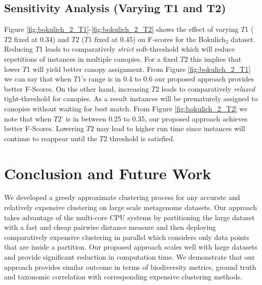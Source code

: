 \documentclass[10pt, conference, compsocconf]{IEEEtran}
\begin{document}
 

\subsection{\textbf{Sensitivity Analysis (Varying T1 and T2)}}
Figure \ref{fig:bokulich_2_T1}-\ref{fig:bokulich_2_T2} shows the 
effect of varying $T1$ ($T2$ fixed at 0.34) and $T2$ ($T1$ fixed at 0.45) on F-scores for the Bokulich$_2$ dataset. Reducing $T1$ leads to
comparatively \textit{strict} soft-threshold which will reduce 
repetitions of instances in multiple canopies. For a fixed $T2$ this implies that 
lower $T1$ will yield better canopy assignment. From Figure \ref{fig:bokulich_2_T1} we can say that 
when $T1$'s range is in 0.4 to 0.6 our proposed approach provides better 
F-Scores. On the other hand, increasing $T2$ leads to comparatively \textit{relaxed} tight-threshold for canopies. As a result instances will be prematurely assigned to canopies without waiting for best match. From Figure \ref{fig:bokulich_2_T2} we note that 
when $T2$'  is in between 0.25 to 0.35, 
our proposed approach achieves better F-Scores. Lowering 
$T2$ may lead to higher run time since instances will continue to reappear 
until the $T2$ threshold is satisfied.                   


\section{Conclusion and Future Work}
\label{sec:Conclusion}

We developed a greedy approximate clustering process for any accurate and relatively expensive clustering on large scale metagenome datasets. Our approach takes advantage of the multi-core CPU systems by partitioning the large dataset with a fast and cheap pairwise distance measure and then deploying comparatively expensive clustering in parallel which considers only data points that are inside a partition. Our proposed approach scales well with large datasets and provide significant reduction in computation time. We demonstrate that our approach provides similar outcome in terms of biodiversity metrics, ground truth and taxonomic correlation with corresponding expensive clustering methods.





\end{document}
